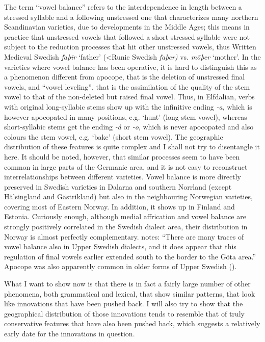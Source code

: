 The term “vowel balance” refers to the interdependence in length between a stressed syllable and a following unstressed one that characterizes many northern Scandinavian varieties, due to developments in the Middle Ages; this means in practice that unstressed vowels that followed a short stressed syllable were not subject to the reduction processes that hit other unstressed vowels, thus Written Medieval Swedish \textit{faþir }‘father’\textit{ }({\textless}Runic Swedish\textit{ faþer)} vs. \textit{m}\textit{\=oþ}\textit{er} ‘mother’.  In the varieties where vowel balance has been operative, it is hard to distinguish this as a phenomenon different from apocope, that is the deletion of unstressed final vowels, and “vowel leveling”, that is the assimilation of the quality of the stem vowel to that of the non-deleted but raised final vowel. Thus, in Elfdalian, verbs with original long-syllabic stems show up with the infinitive ending\textit{ {}-a}, which is however apocopated in many positions, e.g.  ‘hunt’ (long stem vowel), whereas short-syllabic stems get the ending\textit{ {}-å} or\textit{ {}-o}, which is never apocopated and also colours the stem vowel, e.g.  ‘bake’ (short stem vowel). The geographic distribution of these features is quite complex and I shall not try to disentangle it here. It should be noted, however, that similar processes seem to have been common in large parts of the Germanic area, and it is not easy to reconstruct interrelationships between different varieties. Vowel balance is more directly preserved in Swedish varieties in Dalarna and southern Norrland (except Hälsingland and Gästrikland) but also in the neighbouring Norwegian varieties, covering most of Eastern Norway. In addition, it shows up in Finland and Estonia. Curiously enough, although medial affrication and vowel balance are strongly positively correlated in the Swedish dialect area, their distribution in Norway is almost perfectly complementary. \citet[52]{Wessén1966} notes: “There are many traces of vowel balance also in Upper Swedish dialects, and it does appear that this regulation of final vowels earlier extended south to the border to the Göta area.” Apocope was also apparently common in older forms of Upper Swedish (\citet{Wessén1968}).

What I want to show now is that there is in fact a fairly large number of other phenomena, both grammatical and lexical, that show similar patterns, that look like innovations that have been pushed back. I will also try to show that the geographical distribution of those innovations tends to resemble that of truly conservative features that have also been pushed back, which suggests a relatively early date for the innovations in question.

